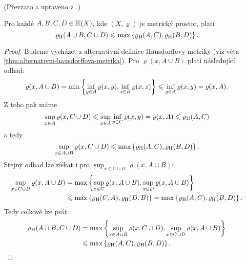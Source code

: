 (Převzato a upraveno z \citep[str. 79]{Barnsley1993}.)
\begin{lemma}\label{lem:hausdorffova-metrika-odhad-sjednoceni}
    Pro každé $A,B,C,D\in\mathbb{H}(X)$, kde $(X,\varrho)$ je metrický prostor, platí
    \[\varrho_\textup{H}(A\cup B,C\cup D)\leqslant\max\left\{\varrho_\textup{H}(A,C),\varrho_\textup{H}(B,D)\right\}.\]
\end{lemma}
\begin{proof}
    Budeme vycházet z alternativní definice Hausdorffovy metriky (viz věta \ref{thm:alternativni-hausdorffova-metrika}). Pro $\varrho(x,A\cup B)$ platí následující odhad:
    \[\varrho(x,A\cup B)=\min\left\{\inf_{y\in A}\varrho(x,y),\inf_{z\in B}\varrho(x,z)\right\}\leqslant\inf_{y\in A}\varrho(x,y)=\varrho(x,A).\]
    Z toho pak máme
    \[\sup_{x\in A}\varrho(x,C\cup D)\leqslant\sup_{x\in A}\inf_{y\in C}\varrho(x,y)=\varrho(x,A)\leqslant\varrho_\textup{H}(A,C)\]
    a tedy
    \[\sup_{x\in A\cup B}\varrho(x,C\cup D)\leqslant\max\left\{\varrho_\textup{H}(A,C),\varrho_\textup{H}(B,D)\right\}.\]
    Stejný odhad lze získat i pro $\sup_{x\in C\cup D}\varrho(x,A\cup B)$:
    \begin{align*}
        \sup_{x\in C\cup D}\varrho(x,A\cup B)&=\max\left\{\sup_{x\in C}\varrho(x,A\cup B),\sup_{x\in D}\varrho(x,A\cup B)\right\}\\
        &\leqslant\max\left\{\varrho_\textup{H}(C,A),\varrho_\textup{H}(D,B)\right\}=\max\left\{\varrho_\textup{H}(A,C),\varrho_\textup{H}(B,D)\right\}.
    \end{align*}
    Tedy celkově lze psát
    \begin{align*}
        \varrho_\textup{H}(A\cup B,C\cup D)&=\max\left\{\sup_{x\in A\cup B}\varrho(x,C\cup D),\sup_{x\in C\cup D}\varrho(x,A\cup B)\right\}\\
        &\leqslant\max\left\{\varrho_\textup{H}(A,C),\varrho_\textup{H}(B,D)\right\}.
    \end{align*}
\end{proof}

